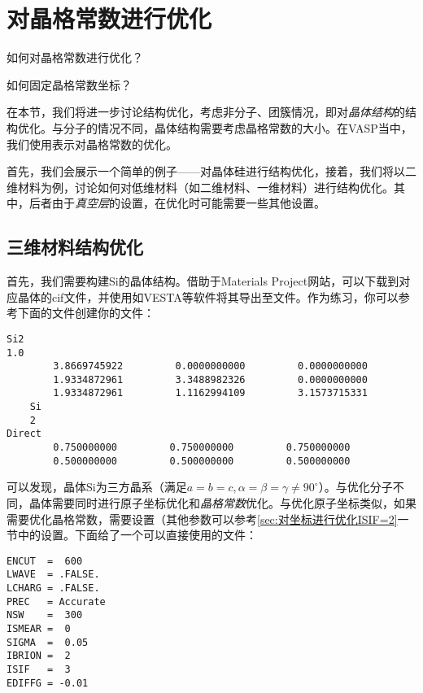 \section{对晶格常数进行优化}\label{sec:对晶格常数进行优化ISIF=3}

\begin{Abstract}
    \item 如何对晶格常数进行优化？
    \item 如何固定晶格常数坐标？
\end{Abstract}

在本节，我们将进一步讨论结构优化，考虑非分子、团簇情况，即对\emph{晶体结构}的结构优化。与分子的情况不同，晶体结构需要考虑晶格常数的大小。在VASP当中，我们使用表示对晶格常数的优化。

首先，我们会展示一个简单的例子——对晶体硅进行结构优化，接着，我们将以二维材料为例，讨论如何对低维材料（如二维材料、一维材料）进行结构优化。其中，后者由于\emph{真空层}的设置，在优化时可能需要一些其他设置。

\subsection{三维材料结构优化}\label{subsec:对晶格常数进行优化ISIF=3-三维材料结构优化}

首先，我们需要构建Si的晶体结构。借助于Materials Project网站，可以下载到对应晶体的cif文件，并使用如VESTA等软件将其导出至文件。作为练习，你可以参考下面的文件创建你的文件：

\begin{lstlisting}[caption=POSCAR]
Si2
1.0
        3.8669745922         0.0000000000         0.0000000000
        1.9334872961         3.3488982326         0.0000000000
        1.9334872961         1.1162994109         3.1573715331
    Si
    2
Direct
        0.750000000         0.750000000         0.750000000
        0.500000000         0.500000000         0.500000000
\end{lstlisting}

可以发现，晶体Si为三方晶系（满足$a=b=c,\alpha=\beta=\gamma\ne90^\circ$）。与优化分子不同，晶体需要同时进行原子坐标优化和\emph{晶格常数}优化。与优化原子坐标类似，如果需要优化晶格常数，需要设置（其他参数可以参考\ref{sec:对坐标进行优化ISIF=2}一节中的设置。下面给了一个可以直接使用的文件：

\begin{lstlisting}[caption=INCAR]
ENCUT  =  600
LWAVE  = .FALSE.
LCHARG = .FALSE.
PREC   = Accurate
NSW    =  300
ISMEAR =  0
SIGMA  =  0.05
IBRION =  2
ISIF   =  3
EDIFFG = -0.01
\end{lstlisting}

